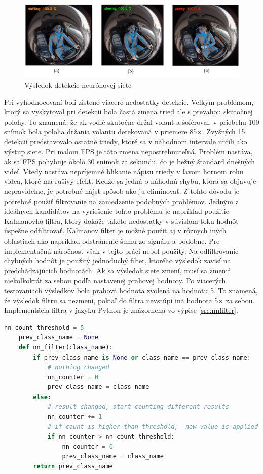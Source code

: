 \documentclass[slovak,master,dept460,male,cpp,cpdeclaration]{diploma}
\begin{document}
\begin{figure}[H]
	\centering
	\includegraphics[width=1\textwidth]{Figures/nnresult2.png}
	\caption{Výsledok detekcie neurónovej siete}
	\label{fig:nnresult1}
\end{figure}

Pri vyhodnocovaní boli zistené viaceré nedostatky detekcie. Veľkým problémom, ktorý sa vyskytoval pri detekcii bola častá zmena tried ale s prevahou skutočnej polohy. To znamená, že ak vodič skutočne držal volant a šoféroval, v priebehu 100 snímok bola poloha držania volantu detekovaná v priemere 85$\times$. Zvyšných 15 detekcii predstavovalo ostatné triedy, ktoré sa  v náhodnom intervale  určili ako výstup siete. Pri malom FPS je táto zmena nepostrehnuteľná. Problém nastáva, ak sa FPS pohybuje okolo 30 snímok za sekundu, čo je bežný štandard dnešných videí. Vtedy nastáva nepríjemné blikanie nápisu triedy  v ľavom hornom rohu videa, ktoré má rušivý efekt. Keďže sa jedná o náhodnú chybu, ktorá sa objavuje nepravidelne, je potrebné nájsť spôsob ako ju eliminovať. Z tohto dôvodu je potrebné použiť filtrovanie na zamedzenie podobných problémov. Jedným z ideálnych kandidátov na vyriešenie tohto problému je napríklad použitie Kalmanovho filtra\cite{kalman1960}, ktorý dokáže takéto nedostatky v súvislom toku hodnôt úspešne odfiltrovať. Kalmanov filter je možné použiť aj  v rôznych iných oblastiach ako napríklad odstránenie šumu zo signálu a podobne. Pre implementačnú náročnosť však v tejto práci nebol použitý. Na odfiltrovanie  chybných hodnôt je použitý jednoduchý filter, ktorého výsledok zavisí na predchádzajúcich hodnotách. Ak sa výsledok siete zmení, musí sa zmeniť niekoľkokrát za sebou podľa nastavenej prahovej hodnoty. Po viacerých testovaniach výsledkov  bola prahová hodnota zvolená na hodnotu 5. To znamená, že  výsledok filtru  sa nezmení, pokiaľ do filtra nevstúpi  iná hodnota 5$\times$ za sebou. Implementácia filtra v jazyku Python je znázornená vo výpise \ref{src:nnfilter}.

\begin{lstlisting}[language=Python,label=src:nnfilter,caption={Jednoduchý filter na odstránenie náhodných hodnôt s použitím prahovej hodnoty}]
	nn_count_threshold = 5
	prev_class_name = None
	def nn_filter(class_name):
    	if prev_class_name is None or class_name == prev_class_name:
    		# nothing changed
        	nn_counter = 0
        	prev_class_name = class_name
    	else:
    		# result changed, start counting different results
        	nn_counter += 1
        	# if count is higher than threshold,  new value is applied
        	if nn_counter > nn_count_threshold:
            	nn_counter = 0
            	prev_class_name = class_name
    	return prev_class_name
\end{lstlisting}
\end{document}
